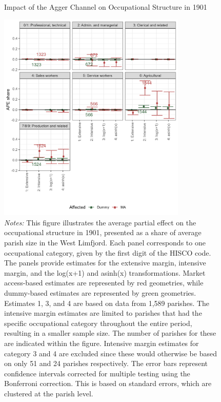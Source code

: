 \documentclass[11pt]{article}
\begin{document}
\begin{figure}[h]
\begin{center}
  \caption{\label{fig:mech_occ} Impact of the Agger Channel on Occupational Structure in 1901}
  \includegraphics[width=0.8\textwidth]{Plots/Mechanism/All_occupations.png}
  \parbox{0.9\textwidth}{
  \caption*{\footnotesize \textit{Notes:} This figure illustrates the average partial effect on the occupational structure in 1901, presented as a share of average parish size in the West Limfjord. Each panel corresponds to one occupational category, given by the first digit of the HISCO code. The panels provide estimates for the extensive margin, intensive margin, and the log(x+1) and asinh(x) transformations. Market access-based estimates are represented by red geometries, while dummy-based estimates are represented by green geometries. Estimates 1, 3, and 4 are based on data from 1,589 parishes. The intensive margin estimates are limited to parishes that had the specific occupational category throughout the entire period, resulting in a smaller sample size. The number of parishes for these are indicated within the figure. Intensive margin estimates for category 3 and 4 are excluded since these would otherwise be based on only 51 and 24 parishes respectively. The error bars represent confidence intervals corrected for multiple testing using the Bonferroni correction. This is based on standard errors, which are clustered at the parish level.}
}
\end{center}
\end{figure}
\end{document}

